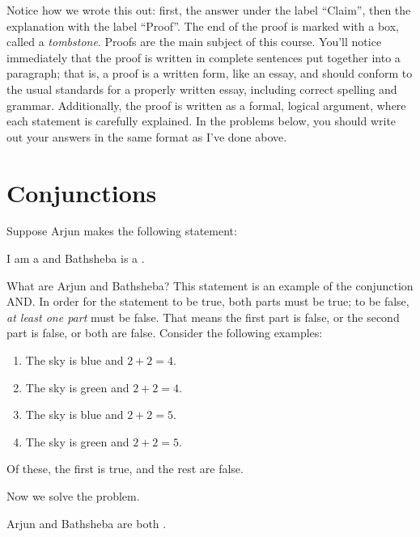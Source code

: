\documentclass{tufte-book}
\begin{document}
Notice how we wrote this out: first, the answer under the label ``Claim'', then the explanation with the label ``Proof''. The end of the proof is marked with a box, called a \emph{tombstone}. Proofs are the main subject of this course. You'll notice immediately that the proof is written in complete sentences put together into a paragraph; that is, a proof is a written form, like an essay, and should conform to the usual standards for a properly written essay, including correct spelling and grammar. Additionally, the proof is written as a formal, logical argument, where each statement is carefully explained. In the problems below, you should write out your answers in the same format as I've done above.



\section{Conjunctions}
\label{sec:conjunctions}

Suppose Arjun makes the following statement:
\begin{example}
  \begin{dialogue}
     I am a \knave and Bathsheba is a \knight.
  \end{dialogue}
\end{example}

What are Arjun and Bathsheba? This statement is an example of the conjunction AND. In order for the statement to be true, both parts must be true; to be false, \emph{at least one part} must be false. That means the first part is false, or the second part is false, or both are false. Consider the following examples:
\begin{enumerate}
    \item The sky is blue and $2 + 2 = 4$.
    \item The sky is green and $2 + 2 = 4$.
    \item The sky is blue and $2 + 2 = 5$.
    \item The sky is green and $2 + 2 = 5$.
\end{enumerate}
Of these, the first is true, and the rest are false.

Now we solve the problem.
\begin{claim}
  Arjun and Bathsheba are both \knaves.
\end{claim}
\end{document}
